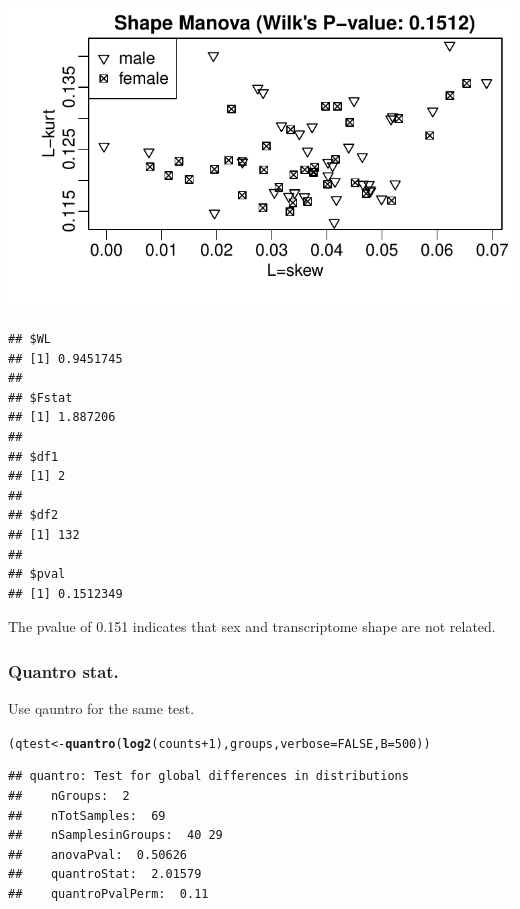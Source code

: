 \documentclass{article}\usepackage[]{graphicx}\usepackage[usenames,dvipsnames]{color}
\makeatletter
\def\maxwidth{ %
  \ifdim\Gin@nat@width>\linewidth
    \linewidth
  \else
    \Gin@nat@width
  \fi
}
\newcommand{\hlnum}[1]{\textcolor[rgb]{0.686,0.059,0.569}{#1}}%
\newcommand{\hlopt}[1]{\textcolor[rgb]{0,0,0}{#1}}%
\newcommand{\hlstd}[1]{\textcolor[rgb]{0.345,0.345,0.345}{#1}}%
\newcommand{\hlkwb}[1]{\textcolor[rgb]{0.69,0.353,0.396}{#1}}%
\newcommand{\hlkwc}[1]{\textcolor[rgb]{0.333,0.667,0.333}{#1}}%
\newcommand{\hlkwd}[1]{\textcolor[rgb]{0.737,0.353,0.396}{\textbf{#1}}}%
\newenvironment{kframe}{%
 \def\at@end@of@kframe{}%
 \ifinner\ifhmode%
  \def\at@end@of@kframe{\end{minipage}}%
  \begin{minipage}{\columnwidth}%
 \fi\fi%
 \def\FrameCommand##1{\hskip\@totalleftmargin \hskip-\fboxsep
 \colorbox{shadecolor}{##1}\hskip-\fboxsep
     \hskip-\linewidth \hskip-\@totalleftmargin \hskip\columnwidth}%
 \MakeFramed {\advance\hsize-\width
   \@totalleftmargin\z@ \linewidth\hsize
   \@setminipage}}%
 {\par\unskip\endMakeFramed%
 \at@end@of@kframe}
\newenvironment{knitrout}{}{} %
\makeatother
\begin{document}
\begin{knitrout}
\color{fgcolor}

{\centering \includegraphics[width=\maxwidth]{figure/lrats-1} 

}


\begin{kframe}\begin{verbatim}
## $WL
## [1] 0.9451745
## 
## $Fstat
## [1] 1.887206
## 
## $df1
## [1] 2
## 
## $df2
## [1] 132
## 
## $pval
## [1] 0.1512349
\end{verbatim}
\end{kframe}
\end{knitrout}

The pvalue of 0.151 indicates that sex and transcriptome shape are not
related.

\subsubsection{Quantro stat.}

Use qauntro for the same test. 

\begin{knitrout}
\color{fgcolor}\begin{kframe}
\begin{alltt}
\hlstd{(qtest} \hlkwb{<-} \hlkwd{quantro}\hlstd{(}\hlkwd{log2}\hlstd{(counts}\hlopt{+}\hlnum{1}\hlstd{), groups,} \hlkwc{verbose}\hlstd{=}\hlnum{FALSE}\hlstd{,} \hlkwc{B}\hlstd{=}\hlnum{500}\hlstd{))}
\end{alltt}
\begin{verbatim}
## quantro: Test for global differences in distributions
##    nGroups:  2 
##    nTotSamples:  69 
##    nSamplesinGroups:  40 29 
##    anovaPval:  0.50626 
##    quantroStat:  2.01579 
##    quantroPvalPerm:  0.11
\end{verbatim}
\end{kframe}
\end{knitrout}
\end{document}
